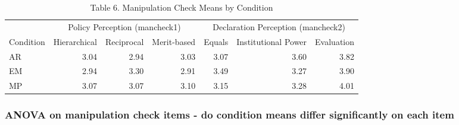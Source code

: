 \documentclass[
]{article}
\begin{document}
\begin{table}[t]
\caption*{
{\fontsize{20}{25}\selectfont  Table 6. Manipulation Check Means by Condition\fontsize{12}{15}\selectfont }
} 
\fontsize{12.0pt}{14.0pt}\selectfont
\begin{tabular*}{\linewidth}{@{\extracolsep{\fill}}lrrrrrr}
\toprule
 & \multicolumn{3}{c}{{Policy Perception (mancheck1)}} & \multicolumn{3}{c}{{Declaration Perception (mancheck2)}} \\ 
\cmidrule(lr){2-4} \cmidrule(lr){5-7}
Condition & Hierarchical & Reciprocal & Merit-based & Equals & Institutional Power & Evaluation \\ 
\midrule\addlinespace[2.5pt]
AR & 3.04 & 2.94 & 3.03 & 3.07 & 3.60 & 3.82 \\ 
EM & 2.94 & 3.30 & 2.91 & 3.49 & 3.27 & 3.90 \\ 
MP & 3.07 & 3.07 & 3.10 & 3.15 & 3.28 & 4.01 \\ 
\bottomrule
\end{tabular*}
\end{table}

\subsubsection{ANOVA on manipulation check items - do condition means
differ significantly on each
item}\label{anova-on-manipulation-check-items---do-condition-means-differ-significantly-on-each-item}
\end{document}
